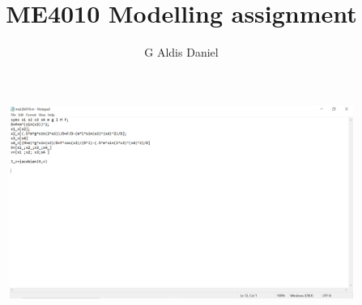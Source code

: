 \documentclass{article}
\author{G Aldis Daniel}
\title{ME4010 Modelling assignment}
\begin{document}
\maketitle



\begin{figure}[h]
\includegraphics[width=\textwidth]{image.png}
\end{figure}
\end{document}
